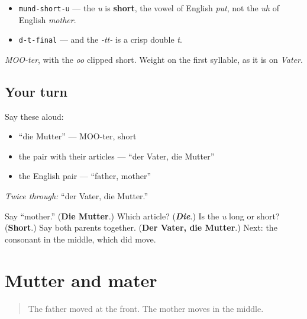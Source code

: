\begin{sounds}
\begin{itemize}
\raggedright
  \item \texttt{mund-short-u} — the \emph{u} is \textbf{short}, the vowel of English \emph{put}, not the \emph{uh} of English \emph{mother}.
  \item \texttt{d-t-final} — and the \emph{-tt-} is a crisp double \emph{t}.
\end{itemize}

\emph{MOO-ter}, with the \emph{oo} clipped short. Weight on the first syllable, as it is on \emph{Vater}.
\end{sounds}

\subsection*{Your turn}
Say these aloud:

\begin{itemize}
\raggedright
  \item \textquotedblleft{}die Mutter\textquotedblright{} — MOO-ter, short
  \item the pair with their articles — \textquotedblleft{}der Vater, die Mutter\textquotedblright{}
  \item the English pair — \textquotedblleft{}father, mother\textquotedblright{}
\end{itemize}

\emph{Twice through:} \textquotedblleft{}der Vater, die Mutter.\textquotedblright{}

\begin{tcolorbox}[breakable,colback=teal!4,colframe=teal!35!black,title={Before you move on}]
Say \textquotedblleft{}mother.\textquotedblright{} (\textbf{Die Mutter}.) Which article? (\emph{\textbf{Die}}.) Is the \emph{u} long or short? (\textbf{Short}.) Say both parents together. (\textbf{Der Vater, die Mutter}.) Next: the consonant in the middle, which did move.
\end{tcolorbox}
\section[Mutter und mater]{Mutter and mater}

\label{lesson:GE-C10-mutter-mater}



\begin{quote}
The father moved at the front. The mother moves in the middle.
\end{quote}

